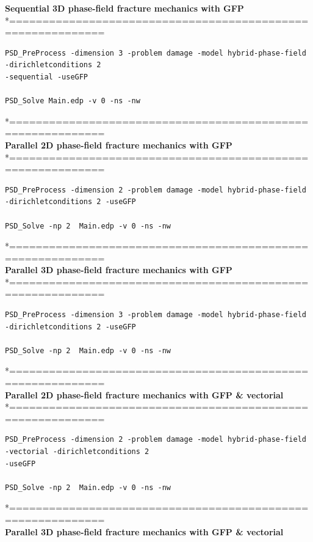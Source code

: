 \textbf{ Sequential 3D phase-field fracture mechanics with GFP} \\
*============================================================\\
\begin{lstlisting}[style=Linux]
PSD_PreProcess -dimension 3 -problem damage -model hybrid-phase-field  -dirichletconditions 2 
-sequential -useGFP   

PSD_Solve Main.edp -v 0 -ns -nw   
\end{lstlisting}
*============================================================\\
\textbf{ Parallel 2D phase-field fracture mechanics with GFP} \\
*============================================================\\
\begin{lstlisting}[style=Linux]
PSD_PreProcess -dimension 2 -problem damage -model hybrid-phase-field -dirichletconditions 2 -useGFP   

PSD_Solve -np 2  Main.edp -v 0 -ns -nw   
\end{lstlisting}
*============================================================\\
\textbf{ Parallel 3D phase-field fracture mechanics with GFP }\\
*============================================================\\
\begin{lstlisting}[style=Linux]
PSD_PreProcess -dimension 3 -problem damage -model hybrid-phase-field -dirichletconditions 2 -useGFP   

PSD_Solve -np 2  Main.edp -v 0 -ns -nw   
\end{lstlisting}
*============================================================\\
\textbf{ Parallel 2D phase-field fracture mechanics with GFP \& vectorial} \\
*============================================================\\
\begin{lstlisting}[style=Linux]
PSD_PreProcess -dimension 2 -problem damage -model hybrid-phase-field -vectorial -dirichletconditions 2 
-useGFP   

PSD_Solve -np 2  Main.edp -v 0 -ns -nw   
\end{lstlisting}
*============================================================\\
\textbf{ Parallel 3D phase-field fracture mechanics with GFP \& vectorial }\\
